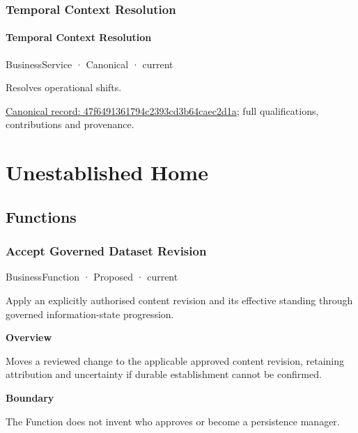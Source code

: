 \subsubsection{Temporal Context Resolution}

\paragraph{Temporal Context Resolution}

\label{element:47f6491361794c2393cd3b64caec2d1a}
{\small BusinessService · Canonical · current}\par

Resolves operational shifts.


{\footnotesize \href{../../../../continuum/business/business-service/47f6491361794c2393cd3b64caec2d1a.md}{Canonical record: 47f6491361794c2393cd3b64caec2d1a}; full qualifications, contributions and provenance.}\par
\section{Unestablished Home}

\subsection{Functions}

\subsubsection{Accept Governed Dataset Revision}

\label{element:96c1c089e7f2443dbd3ad5beab6a3011}
{\small BusinessFunction · Proposed · current}\par

Apply an explicitly authorised content revision and its effective standing through governed information-state progression.



\textbf{Overview}



Moves a reviewed change to the applicable approved content revision, retaining attribution and uncertainty if durable establishment cannot be confirmed.



\textbf{Boundary}



The Function does not invent who approves or become a persistence manager.


